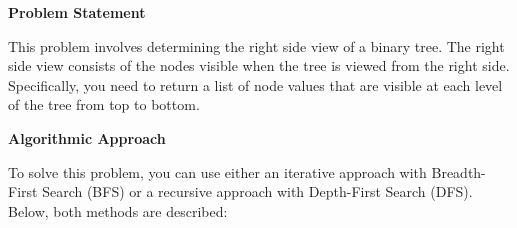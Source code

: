 

\textbf{Problem Statement}

This problem involves determining the right side view of a binary tree. The right side view consists of the nodes visible when the tree is viewed from the right side. Specifically, you need to return a list of node values that are visible at each level of the tree from top to bottom.

\textbf{Algorithmic Approach}

To solve this problem, you can use either an iterative approach with Breadth-First Search (BFS) or a recursive approach with Depth-First Search (DFS). Below, both methods are described:

